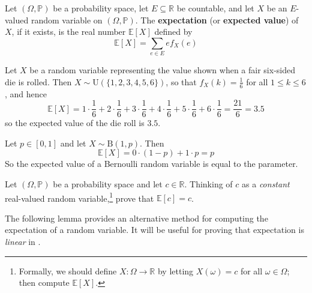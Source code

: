 \begin{definition}
\label{defExpectation}
Let $(\Omega,\mathbb{P})$ be a probability space, let $E \subseteq \mathbb{R}$ be countable, and let $X$ be an $E$-valued random variable on $(\Omega,\mathbb{P})$. The \textbf{expectation} (or \textbf{expected value}) of $X$, if it exists, is the real number $\mathbb{E}[X]$  defined by
\[ \mathbb{E}[X] = \sum_{e \in E} e f_X(e) \]
\end{definition}

\begin{example}
\label{exExpectationFairDieRoll}
Let $X$ be a random variable representing the value shown when a fair six-sided die is rolled. Then $X \sim \mathrm{U}(\{ 1, 2, 3, 4, 5, 6 \})$, so that $f_X(k)=\frac{1}{6}$ for all $1 \le k \le 6$, and hence
\[ \mathbb{E}[X] = 1 \cdot \frac{1}{6} + 2 \cdot \frac{1}{6} + 3 \cdot \frac{1}{6} + 4 \cdot \frac{1}{6} + 5 \cdot \frac{1}{6} + 6 \cdot \frac{1}{6} = \frac{21}{6} = 3.5 \]
so the expected value of the die roll is $3.5$.
\end{example}

\begin{example}
\label{exExpectationOfBernoulli}
Let $p \in [0,1]$ and let $X \sim \mathrm{B}(1,p)$. Then
\[ \mathbb{E}[X] = 0 \cdot (1-p) + 1 \cdot p = p \]
So the expected value of a Bernoulli random variable is equal to the parameter.
\end{example}

\begin{exercise}
Let $(\Omega,\mathbb{P})$ be a probability space and let $c \in \mathbb{R}$. Thinking of $c$ as a \textit{constant} real-valued random variable,\footnote{Formally, we should define $X : \Omega \to \mathbb{R}$ by letting $X(\omega)=c$ for all $\omega \in \Omega$; then compute $\mathbb{E}[X]$.} prove that $\mathbb{E}[c]=c$.
\end{exercise}

The following lemma provides an alternative method for computing the expectation of a random variable. It will be useful for proving that expectation is \textit{linear} in .


